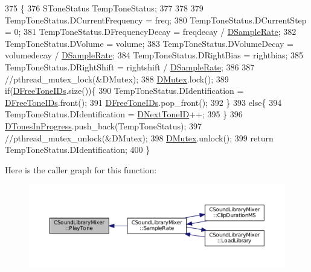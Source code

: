 \begin{DoxyCode}
375                                                                                                            
                          \{
376     SToneStatus TempToneStatus;
377     
378 
379     TempToneStatus.DCurrentFrequency = freq;
380     TempToneStatus.DCurrentStep = 0;
381     TempToneStatus.DFrequencyDecay = freqdecay / \hyperlink{classCSoundLibraryMixer_af2d94eb0c2b55d92ff00d18a25cbed6a}{DSampleRate};
382     TempToneStatus.DVolume = volume;
383     TempToneStatus.DVolumeDecay = volumedecay / \hyperlink{classCSoundLibraryMixer_af2d94eb0c2b55d92ff00d18a25cbed6a}{DSampleRate};
384     TempToneStatus.DRightBias = rightbias;
385     TempToneStatus.DRightShift = rightshift / \hyperlink{classCSoundLibraryMixer_af2d94eb0c2b55d92ff00d18a25cbed6a}{DSampleRate};
386     
387     \textcolor{comment}{//pthread\_mutex\_lock(&DMutex);}
388     \hyperlink{classCSoundLibraryMixer_a955562a0638df831413a1c6b8860f9fb}{DMutex}.lock();
389     \textcolor{keywordflow}{if}(\hyperlink{classCSoundLibraryMixer_a2d1389368651db10fd6fd8b3cd08c164}{DFreeToneIDs}.size())\{
390         TempToneStatus.DIdentification = \hyperlink{classCSoundLibraryMixer_a2d1389368651db10fd6fd8b3cd08c164}{DFreeToneIDs}.front();
391         \hyperlink{classCSoundLibraryMixer_a2d1389368651db10fd6fd8b3cd08c164}{DFreeToneIDs}.pop\_front();
392     \}
393     \textcolor{keywordflow}{else}\{
394         TempToneStatus.DIdentification = \hyperlink{classCSoundLibraryMixer_a88efc1ea710744bceadccf66967f9736}{DNextToneID}++;    
395     \}
396     \hyperlink{classCSoundLibraryMixer_a39bb9c811d842a282b6b7058ac7dfe1c}{DTonesInProgress}.push\_back(TempToneStatus);
397     \textcolor{comment}{//pthread\_mutex\_unlock(&DMutex);  }
398     \hyperlink{classCSoundLibraryMixer_a955562a0638df831413a1c6b8860f9fb}{DMutex}.unlock();
399     \textcolor{keywordflow}{return} TempToneStatus.DIdentification;
400 \}
\end{DoxyCode}
Here is the caller graph for this function\+:\nopagebreak
\begin{figure}[H]
\begin{center}
\leavevmode
\includegraphics[width=350pt]{classCSoundLibraryMixer_a48bf99193d92c07a5c5229d58a10d9fe_icgraph}
\end{center}
\end{figure}
\hypertarget{classCSoundLibraryMixer_a03221f151dfe72381da5d0d0539bab94}{}\label{classCSoundLibraryMixer_a03221f151dfe72381da5d0d0539bab94} 
